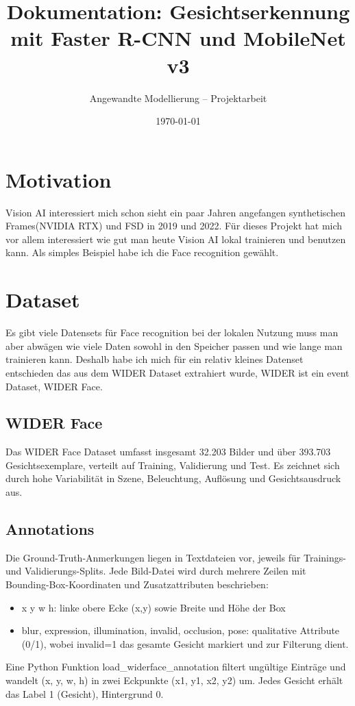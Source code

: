 \documentclass[11pt,a4paper]{article}
\title{\textbf{Dokumentation: Gesichtserkennung mit Faster R-CNN und MobileNet v3}}
\author{Angewandte Modellierung – Projektarbeit}
\date{\today}
\begin{document}
\maketitle

\tableofcontents
\newpage



\section{Motivation}
Vision AI interessiert mich schon sieht ein paar Jahren angefangen synthetischen Frames(NVIDIA RTX) und FSD in 2019 und 2022. Für dieses Projekt hat mich vor allem interessiert wie gut man heute Vision AI lokal trainieren und benutzen kann. Als simples Beispiel habe ich die Face recognition gewählt.

\section{Dataset}
Es gibt viele Datensets für Face recognition bei der lokalen Nutzung muss man aber abwägen wie viele Daten sowohl in den Speicher passen und wie lange man trainieren kann. Deshalb habe ich mich für ein relativ kleines Datenset entschieden das aus dem WIDER Dataset extrahiert wurde, WIDER ist ein event Dataset, WIDER Face.

\subsection{WIDER Face}
Das WIDER Face Dataset umfasst insgesamt 32.203 Bilder und über 393.703 Gesichtsexemplare, verteilt auf Training, Validierung und Test. Es zeichnet sich durch hohe Variabilität in Szene, Beleuchtung, Auflösung und Gesichtsausdruck aus.

\subsection{Annotations}
Die Ground-Truth-Anmerkungen liegen in Textdateien vor, jeweils für Trainings- und Validierungs-Splits. Jede Bild-Datei wird durch mehrere Zeilen mit Bounding-Box-Koordinaten und Zusatzattributen beschrieben:
\begin{itemize}
\item x y w h: linke obere Ecke (x,y) sowie Breite und Höhe der Box
\item blur, expression, illumination, invalid, occlusion, pose: qualitative Attribute (0/1), wobei invalid=1 das gesamte Gesicht markiert und zur Filterung dient.
\end{itemize}
Eine Python Funktion load\_widerface\_annotation filtert ungültige Einträge und wandelt (x, y, w, h) in zwei Eckpunkte (x1, y1, x2, y2) um. Jedes Gesicht erhält das Label 1 (Gesicht), Hintergrund 0.
\end{document}
